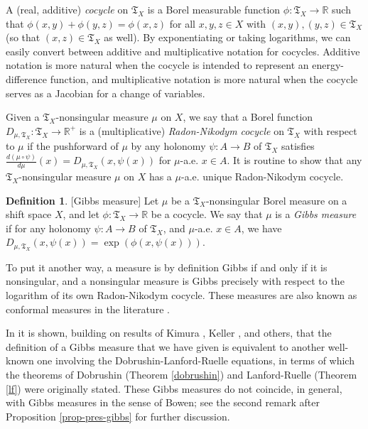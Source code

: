 \documentclass{amsproc}
\numberwithin{theorem}{section}
\theoremstyle{remark}
\theoremstyle{definition}
\newtheorem{defn}[theorem]{Definition}
\newcommand{\fT}{\mathfrak{T}}
\newcommand{\R}{\mathbb{R}}
\theoremstyle{plain}
\begin{document}
A (real, additive) \textit{cocycle} on $\fT_X$ is a Borel measurable function $\phi: \fT_X \to \R$ such that $\phi(x,y) + \phi(y,z) = \phi(x,z)$ for all $x,y,z \in X$ with $(x,y), (y,z) \in \fT_X$ (so that $(x,z) \in \fT_X$ as well). By exponentiating or taking logarithms, we can easily convert between additive and multiplicative notation for cocycles. Additive notation is more natural when the cocycle is intended to represent an energy-difference function, and multiplicative notation is more natural when the cocycle serves as a Jacobian for a change of variables.

Given a $\fT_X$-nonsingular measure $\mu$ on $X$, we say that a Borel function $D_{\mu,\fT_X}: \fT_X \to \R^+$ is a (multiplicative) \textit{Radon-Nikodym cocycle} on $\fT_X$ with respect to $\mu$ if the pushforward of $\mu$ by any holonomy $\psi: A \to B$ of $\fT_X$ satisfies $\frac{d(\mu \circ \psi)}{d\mu}(x) = D_{\mu,\fT_X}(x, \psi(x))$ for $\mu$-a.e. $x \in A$. It is routine to show that any $\fT_X$-nonsingular measure $\mu$ on $X$ has a $\mu$-a.e. unique Radon-Nikodym cocycle. 

\begin{defn}\label{Gibbs-measure-defn}[Gibbs measure]
    Let $\mu$ be a $\fT_X$-nonsingular Borel measure on a shift space $X$, and let $\phi: \fT_X \to \R$ be a cocycle. We say that $\mu$ is a \textit{Gibbs measure} if for any holonomy $\psi: A \to B$ of $\fT_X$, and $\mu$-a.e. $x \in A$, we have $D_{\mu, \fT_X}(x,\psi(x)) = \exp(\phi(x,\psi(x)))$.
\end{defn}

To put it another way, a measure is by definition Gibbs if and only if it is nonsingular, and a nonsingular measure is Gibbs precisely with respect to the logarithm of its own Radon-Nikodym cocycle. These measures are also known as conformal measures in the literature \cite{borsato2020conformal, meyerovitch2013gibbs}.



In \cite{borsato2020conformal} it is shown, building on results of Kimura \cite{kimura-2015-thesis}, Keller \cite{keller1998equilibrium}, and others, that the definition of a Gibbs measure that we have given is equivalent to another well-known one involving the Dobrushin-Lanford-Ruelle equations, in terms of which the theorems of Dobrushin (Theorem \ref{dobrushin}) and Lanford-Ruelle (Theorem \ref{lf}) were originally stated. These Gibbs measures do not coincide, in general, with Gibbs measures in the sense of Bowen; see the second remark after Proposition \ref{prop-pres-gibbs} for further discussion.
\end{document}
